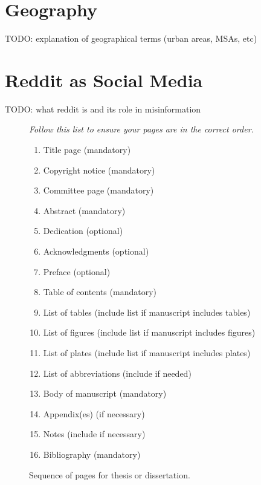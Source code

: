 \documentclass[12pt,oneside, letterpaper]{book}
\begin{document}
\section{Geography}
\par TODO: explanation of geographical terms (urban areas, MSAs, etc)

\section{Reddit as Social Media}
\par TODO: what reddit is and its role in misinformation

\begin{figure}[ht]
    \centering
    \begin{minipage}[t]{0.8\textwidth}
    \textit{Follow this list to ensure your pages are in the correct order. \\}
	\begin{enumerate}
	    \item Title page (mandatory)
	    \item Copyright notice (mandatory)
	    \item Committee page (mandatory)
	    \item Abstract (mandatory)
	    \item Dedication (optional)
	    \item Acknowledgments (optional)
	    \item Preface (optional)
	    \item Table of contents (mandatory)
	    \item List of tables (include list if manuscript includes tables)
	    \item List of figures (include list if manuscript includes figures)
	    \item List of plates (include list if manuscript includes plates)
	    \item List of abbreviations (include if needed)
	    \item Body of manuscript (mandatory)
	    \item Appendix(es) (if necessary)
	    \item Notes (include if necessary)
	    \item Bibliography (mandatory)
	\end{enumerate}
	\end{minipage}
    \caption{Sequence of pages for thesis or dissertation.}
	\label{fig:fig-1}
\end{figure}
\end{document}
